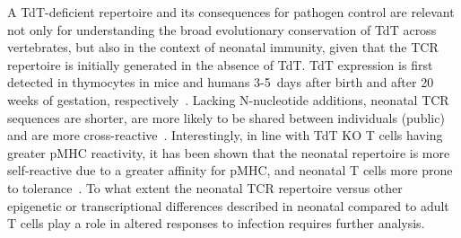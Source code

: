 A TdT-deficient repertoire and its consequences for pathogen control are relevant not only for understanding the broad evolutionary conservation of TdT across vertebrates, but also in the context of neonatal immunity, given that the TCR repertoire is initially generated in the absence of TdT. TdT expression is first detected in thymocytes in mice and humans 3-5~days after birth and after 20 weeks of gestation, respectively~\cite{bonati1994tcr,bogue1992regulation}. Lacking N-nucleotide additions, neonatal TCR sequences are shorter, are more likely to be shared between individuals (public)~\cite{yassai2000thymocyte,yassai2002molecular} and are more cross-reactive~\cite{gavin1995increased}. Interestingly, in line with TdT KO T cells having greater pMHC reactivity, it has been shown that the neonatal repertoire is more self-reactive due to a greater affinity for pMHC, and neonatal T cells more prone to tolerance~\cite{rudd2020neonatal}. To what extent the neonatal TCR repertoire versus other epigenetic or transcriptional differences described in neonatal compared to adult T cells play a role in altered responses to infection requires further analysis.

